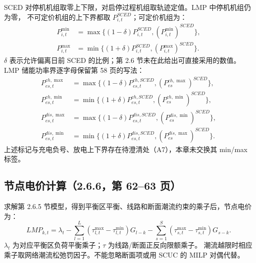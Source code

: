 SCED 对停机机组取零上下限，对启停过程机组取轨迹定值。LMP 中停机机组仍为零，
不可定价机组的上下界都取 $P^{SCED}_{i,t}$；可定价机组为：
\begin{align}
 P^{\min}_{i,t}&=\max\{(1-\delta)P^{SCED}_{i,t},(P^{\min}_{i,t})^{SCED}\},\\
 P^{\max}_{i,t}&=\min\{(1+\delta)P^{SCED}_{i,t},(P^{\max}_{i,t})^{SCED}\}.
\end{align}
$\delta$ 表示允许偏离日前 SCED 的比例；第 2.6 节未在此给出可直接采用的数值。
LMP 储能功率界逐字母保留第 58 页的写法：
\begin{align}
 P^{ch,\max}_{es,t}&=\max\{(1-\delta)P^{ch,SCED}_{es,t},(P^{ch,\max}_{es})^{SCED}\},\\
 P^{ch,\min}_{es,t}&=\min\{(1+\delta)P^{ch,SCED}_{es,t},(P^{ch,\min}_{es})^{SCED}\},\\
 P^{dis,\max}_{es,t}&=\max\{(1-\delta)P^{dis,SCED}_{es,t},(P^{dis,\min}_{es})^{SCED}\},\\
 P^{dis,\min}_{es,t}&=\min\{(1+\delta)P^{dis,SCED}_{es,t},(P^{dis,\max}_{es})^{SCED}\}.
\end{align}
上述标记与充电负号、放电上下界存在待澄清处（A7），本章未交换其 min/max 标签。
\subsection{节点电价计算（2.6.6，第 62--63 页）}
求解第 2.6.5 节模型，得到平衡区平衡、线路和断面潮流约束的乘子后，节点电价为：
\begin{equation}
 LMP_{k,t}=\lambda_t-\sum_{l=1}^{L}(\tau^{\max}_{l,t}-\tau^{\min}_{l,t})G_{l-k}
                       -\sum_{s=1}^{S}(\tau^{\max}_{s,t}-\tau^{\min}_{s,t})G_{s-k}.
\end{equation}
$\lambda_t$ 为对应平衡区负荷平衡乘子；$\tau$ 为线路/断面正反向限额乘子。
潮流越限时相应乘子取网络潮流松弛罚因子。不能忽略断面项或用 SCUC 的 MILP 对偶代替。

